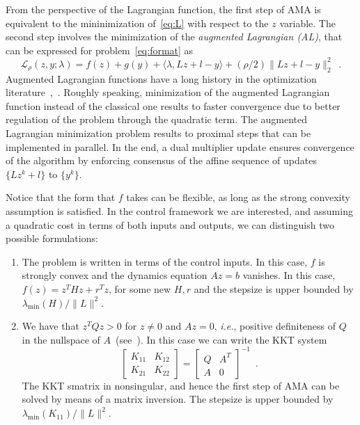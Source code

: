 \documentclass[openany]{now}
\newcommand{\ie}{{\it i.e.}}
\begin{document}
  From the perspective of the Lagrangian function, the first step of AMA is equivalent to the mininimization of~\eqref{eq:L} with respect to the $z$ variable. The second step involves the minimization of the \emph{augmented Lagrangian (AL)}, that can be expressed for problem~\eqref{eq:format} as 
  \begin{equation}\label{eq:AL}
  \mathcal{L}_\rho(z,y;\lambda) = f(z)+ g(y) + \langle \lambda,  L z + l - y\rangle  + (\rho/2)\|L z + l - y\|_2^2\enspace. \tag{AL} 
  \end{equation}
  Augmented Lagrangian functions have a long history in the optimization literature~\cite{prox_admm},~\cite{Bertsekas_AL}. Roughly speaking, minimization of the augmented Lagrangian function instead of the classical one results to faster convergence due to better regulation of the problem through the quadratic term. The augmented Lagrangian minimization problem results to proximal steps that can be implemented in parallel. In the end, a dual multiplier update ensures convergence of the algorithm by enforcing consensus of the affine sequence of updates $\{Lz^k+l\}$ to $\{y^k\}$.

  \begin{remark}
  Notice that the form that $f$ takes can be flexible, as long as the strong convexity assumption is satisfied. In the control framework we are interested, and assuming a quadratic cost in terms of both inputs and outputs, we can distinguish two possible formulations:
  \begin{enumerate}
  \item The problem is written in terms of the control inputs. In this case, $f$ is strongly convex and the dynamics equation $Az=b$ vanishes. In this case, $f(z)=z^THz+r^Tz$, for some new $H,r$ and the stepsize is upper bounded by $\lambda_{\mathrm{min}}(H)/\|L\|^2$.
  \item We have that $z^TQz>0$ for $z\neq 0$ and $Az=0$, \ie, positive definiteness of $Q$ in the nullspace of $A$~(see~\cite[Proposition~33]{Giselsson:fbds}). In this case we can write the KKT system
  \[ \left[\begin{array}{cc}K_{11} & K_{12} \\ K_{21} & K_{22}\end{array}\right] = \left[\begin{array}{cc}Q & A^T \\ A & 0\end{array}\right]^{-1}\enspace.
  \]
  The KKT smatrix in nonsingular, and hence the first step of AMA can be solved by means of a matrix inversion. The stepsize is upper bounded by $\lambda_{\mathrm{min}}(K_{11})/\|L\|^2$.
  \end{enumerate}
  \end{remark} 
  
\end{document}
